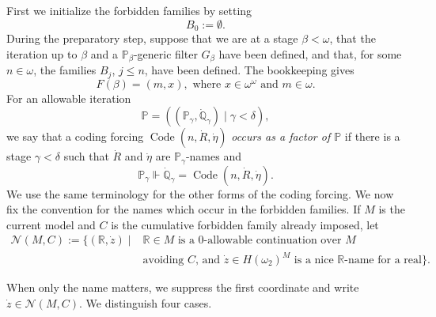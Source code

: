 \documentclass[a4paper,11pt]{article}
\newcommand{\forceP}{\mathbb{P}}
\newcommand{\forceQ}{\mathbb{Q}}
\newcommand{\forceR}{\mathbb{R}}
\begin{document}
First we initialize the forbidden families by setting
\[
B_0:=\emptyset.
\]
During the preparatory step, suppose that we are at a stage $\beta<\omega$, that the iteration up to $\beta$ and a $\forceP_\beta$-generic filter $G_\beta$ have been defined, and that, for some $n\in\omega$, the families $B_j$, $j\leq n$, have been defined. The bookkeeping gives
\[
F(\beta)=(m,x), \text{ where } x\in\omega^\omega \text{ and }m\in\omega.
\]
For an allowable iteration
\[
\forceP=((\forceP_\gamma,\dot{\forceQ}_\gamma)\mid\gamma<\delta),
\]
we say that a coding forcing $\operatorname{Code}(n,\dot R,\dot\eta)$ \emph{occurs as a factor of $\forceP$} if there is a stage $\gamma<\delta$ such that $\dot R$ and $\dot\eta$ are $\forceP_\gamma$-names and
\[
\forceP_\gamma\Vdash
\dot{\forceQ}_\gamma=\operatorname{Code}(n,\dot R,\dot\eta).
\]
We use the same terminology for the other forms of the coding forcing. We now fix the convention for the names which occur in the forbidden families. If $M$ is the current model and $C$ is the cumulative forbidden family already imposed, let
\begin{align*}
    \mathcal N(M,C):=\{(\forceR,\dot z) \mid& \forceR\in M\text{ is a $0$-allowable continuation over $M$} \\&\text{avoiding $C$, and }\dot z\in H(\omega_2)^M\text{ is a nice $\forceR$-name for a real}\}.
\end{align*}


When only the name matters, we suppress the first coordinate and write $\dot z\in\mathcal N(M,C)$. 
We distinguish four cases.
\end{document}
